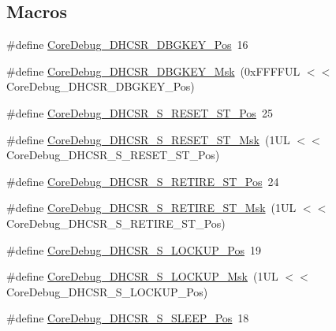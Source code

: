 \subsection*{Macros}
\begin{DoxyCompactItemize}
\item 
\#define \hyperlink{group___c_m_s_i_s___core_debug_gac91280edd0ce932665cf75a23d11d842}{Core\+Debug\+\_\+\+D\+H\+C\+S\+R\+\_\+\+D\+B\+G\+K\+E\+Y\+\_\+\+Pos}~16
\item 
\#define \hyperlink{group___c_m_s_i_s___core_debug_ga1ce997cee15edaafe4aed77751816ffc}{Core\+Debug\+\_\+\+D\+H\+C\+S\+R\+\_\+\+D\+B\+G\+K\+E\+Y\+\_\+\+Msk}~(0x\+F\+F\+F\+F\+U\+L $<$$<$ Core\+Debug\+\_\+\+D\+H\+C\+S\+R\+\_\+\+D\+B\+G\+K\+E\+Y\+\_\+\+Pos)
\item 
\#define \hyperlink{group___c_m_s_i_s___core_debug_ga6f934c5427ea057394268e541fa97753}{Core\+Debug\+\_\+\+D\+H\+C\+S\+R\+\_\+\+S\+\_\+\+R\+E\+S\+E\+T\+\_\+\+S\+T\+\_\+\+Pos}~25
\item 
\#define \hyperlink{group___c_m_s_i_s___core_debug_gac474394bcceb31a8e09566c90b3f8922}{Core\+Debug\+\_\+\+D\+H\+C\+S\+R\+\_\+\+S\+\_\+\+R\+E\+S\+E\+T\+\_\+\+S\+T\+\_\+\+Msk}~(1\+U\+L $<$$<$ Core\+Debug\+\_\+\+D\+H\+C\+S\+R\+\_\+\+S\+\_\+\+R\+E\+S\+E\+T\+\_\+\+S\+T\+\_\+\+Pos)
\item 
\#define \hyperlink{group___c_m_s_i_s___core_debug_ga2328118f8b3574c871a53605eb17e730}{Core\+Debug\+\_\+\+D\+H\+C\+S\+R\+\_\+\+S\+\_\+\+R\+E\+T\+I\+R\+E\+\_\+\+S\+T\+\_\+\+Pos}~24
\item 
\#define \hyperlink{group___c_m_s_i_s___core_debug_ga89dceb5325f6bcb36a0473d65fbfcfa6}{Core\+Debug\+\_\+\+D\+H\+C\+S\+R\+\_\+\+S\+\_\+\+R\+E\+T\+I\+R\+E\+\_\+\+S\+T\+\_\+\+Msk}~(1\+U\+L $<$$<$ Core\+Debug\+\_\+\+D\+H\+C\+S\+R\+\_\+\+S\+\_\+\+R\+E\+T\+I\+R\+E\+\_\+\+S\+T\+\_\+\+Pos)
\item 
\#define \hyperlink{group___c_m_s_i_s___core_debug_ga2900dd56a988a4ed27ad664d5642807e}{Core\+Debug\+\_\+\+D\+H\+C\+S\+R\+\_\+\+S\+\_\+\+L\+O\+C\+K\+U\+P\+\_\+\+Pos}~19
\item 
\#define \hyperlink{group___c_m_s_i_s___core_debug_ga7b67e4506d7f464ef5dafd6219739756}{Core\+Debug\+\_\+\+D\+H\+C\+S\+R\+\_\+\+S\+\_\+\+L\+O\+C\+K\+U\+P\+\_\+\+Msk}~(1\+U\+L $<$$<$ Core\+Debug\+\_\+\+D\+H\+C\+S\+R\+\_\+\+S\+\_\+\+L\+O\+C\+K\+U\+P\+\_\+\+Pos)
\item 
\#define \hyperlink{group___c_m_s_i_s___core_debug_ga349ccea33accc705595624c2d334fbcb}{Core\+Debug\+\_\+\+D\+H\+C\+S\+R\+\_\+\+S\+\_\+\+S\+L\+E\+E\+P\+\_\+\+Pos}~18
\item 

\end{DoxyCompactItemize}
